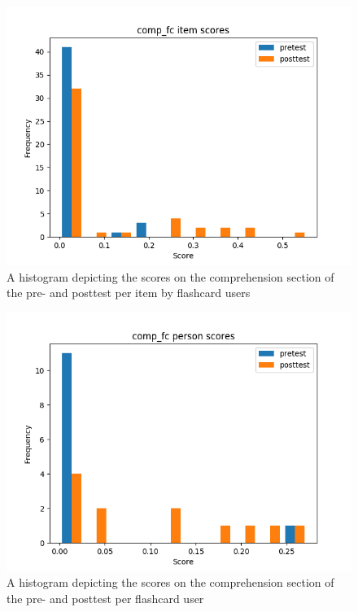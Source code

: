 \begin{figure}
    \centering
    \includegraphics[width=.7\textwidth]{img/comp_fc_diff.png}
    \caption{A histogram depicting the scores on the comprehension section of the pre- and posttest per item by flashcard users}
    \label{fig:comp_fc_diff}
\end{figure}
\begin{figure}
    \centering
    \includegraphics[width=.7\textwidth]{img/comp_fc_abil.png}
    \caption{A histogram depicting the scores on the comprehension section of the pre- and posttest per flashcard user}
    \label{fig:comp_fc_abil}
\end{figure}

